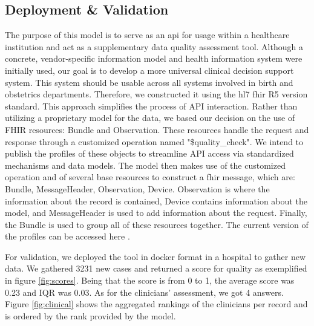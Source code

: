 \subsection{Deployment \& Validation}
The purpose of this model is to serve as an \ac{api} for usage within a healthcare institution and act as a supplementary data quality assessment tool. Although a concrete, vendor-specific information model and health information system were initially used, our goal is to develop a more universal clinical decision support system. This system should be usable across all systems involved in birth and obstetrics departments. Therefore, we constructed it using the \ac{hl7} \ac{fhir} R5 version standard. This approach simplifies the process of API interaction. Rather than utilizing a proprietary model for the data, we based our decision on the use of FHIR resources: Bundle and Observation. These resources handle the request and response through a customized operation named "\$quality\_check". We intend to publish the profiles of these objects to streamline API access via standardized mechanisms and data models. The model then makes use of the customized operation and of several base resources to construct a \ac{fhir} message, which are: Bundle, MessageHeader, Observation, Device. Observation is where the information about the record is contained, Device contains information about the model, and MessageHeader is used to add information about the request. Finally, the Bundle is used to group all of these resources together. The current version of the profiles can be accessed here \cite{almeidaObstetricsClinicalDecision}.

For validation, we deployed the tool in docker format in a hospital to gather new data. We gathered 3231 new cases and returned a score for quality as exemplified in figure \ref{fig:scores}. Being that the score is from 0 to 1, the average score was 0.23 and IQR was 0.03.
As for the clinicians' assessment, we got 4 answers. Figure \ref{fig:clinical} shows the aggregated rankings of the clinicians per record and is ordered by the rank provided by the model.



